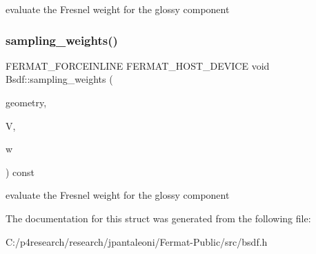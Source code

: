 evaluate the Fresnel weight for the glossy component \mbox{\label{struct_bsdf_aa3382a14f577b359f61cca760a7d1296}} 
\subsubsection{\texorpdfstring{sampling\+\_\+weights()}{sampling\_weights()}\hspace{0.1cm}{\footnotesize\ttfamily [2/2]}}
{\footnotesize\ttfamily F\+E\+R\+M\+A\+T\+\_\+\+F\+O\+R\+C\+E\+I\+N\+L\+I\+NE F\+E\+R\+M\+A\+T\+\_\+\+H\+O\+S\+T\+\_\+\+D\+E\+V\+I\+CE void Bsdf\+::sampling\+\_\+weights (\begin{DoxyParamCaption}\item[{const \hyperlink{structcugar_1_1_differential_geometry}{cugar\+::\+Differential\+Geometry} \&}]{geometry,  }\item[{const \hyperlink{structcugar_1_1_vector}{cugar\+::\+Vector3f}}]{V,  }\item[{float $\ast$}]{w }\end{DoxyParamCaption}) const\hspace{0.3cm}{\ttfamily [inline]}}

evaluate the Fresnel weight for the glossy component 

The documentation for this struct was generated from the following file\+:\begin{DoxyCompactItemize}
\item 
C\+:/p4research/research/jpantaleoni/\+Fermat-\/\+Public/src/bsdf.\+h\end{DoxyCompactItemize}
